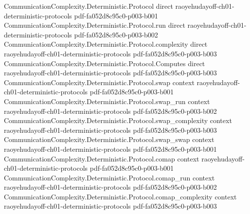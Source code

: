 \begin{theorem}
\label{CommunicationComplexity.Deterministic.Protocol.rectangle_partition}
\leanok
{}
\proofstep
  {CommunicationComplexity.Deterministic.Protocol}
  {direct}
  {raoyehudayoff-ch01-deterministic-protocols}
  {pdf-fa052d8c95c0-p003-b001}
\proofstep
  {CommunicationComplexity.Deterministic.Protocol.run}
  {direct}
  {raoyehudayoff-ch01-deterministic-protocols}
  {pdf-fa052d8c95c0-p003-b002}
\proofstep
  {CommunicationComplexity.Deterministic.Protocol.complexity}
  {direct}
  {raoyehudayoff-ch01-deterministic-protocols}
  {pdf-fa052d8c95c0-p003-b003}
\proofstep
  {CommunicationComplexity.Deterministic.Protocol.Computes}
  {direct}
  {raoyehudayoff-ch01-deterministic-protocols}
  {pdf-fa052d8c95c0-p003-b003}
\proofstep
  {CommunicationComplexity.Deterministic.Protocol.swap}
  {context}
  {raoyehudayoff-ch01-deterministic-protocols}
  {pdf-fa052d8c95c0-p003-b001}
\proofstep
  {CommunicationComplexity.Deterministic.Protocol.swap_run}
  {context}
  {raoyehudayoff-ch01-deterministic-protocols}
  {pdf-fa052d8c95c0-p003-b002}
\proofstep
  {CommunicationComplexity.Deterministic.Protocol.swap_complexity}
  {context}
  {raoyehudayoff-ch01-deterministic-protocols}
  {pdf-fa052d8c95c0-p003-b003}
\proofstep
  {CommunicationComplexity.Deterministic.Protocol.swap_swap}
  {context}
  {raoyehudayoff-ch01-deterministic-protocols}
  {pdf-fa052d8c95c0-p003-b001}
\proofstep
  {CommunicationComplexity.Deterministic.Protocol.comap}
  {context}
  {raoyehudayoff-ch01-deterministic-protocols}
  {pdf-fa052d8c95c0-p003-b001}
\proofstep
  {CommunicationComplexity.Deterministic.Protocol.comap_run}
  {context}
  {raoyehudayoff-ch01-deterministic-protocols}
  {pdf-fa052d8c95c0-p003-b002}
\proofstep
  {CommunicationComplexity.Deterministic.Protocol.comap_complexity}
  {context}
  {raoyehudayoff-ch01-deterministic-protocols}
  {pdf-fa052d8c95c0-p003-b003}

\end{theorem}
